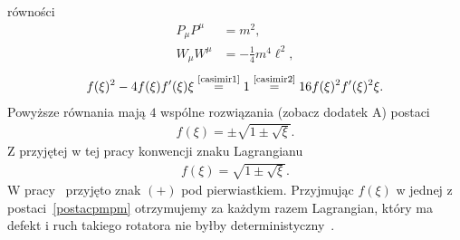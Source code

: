 równości
\begin{align} \label{casimir1}
P_\mu P^\mu &= m^2, \tag{C1} \\ \label{casimir2}
W_\mu W^\mu &= - \frac{1}{4} m^4 \ell^2 , \tag{C2}
\end{align}
\begin{align}\nonumber
 f(\xi)^2- 4 f(\xi) f'(\xi) \xi
\stackrel{\text{\ref{casimir1}}}{=} 
1 \stackrel{\text{\ref{casimir2}}}{=}
  16   f(\xi)^2 f'(\xi)^2 \xi .
\end{align}
Powyższe równania mają $4$ wspólne rozwiązania (zobacz dodatek A)
postaci 
\begin{align}\label{postacpmpm}
f(\xi ) = \pm \sqrt{ 1 \pm \sqrt{\xi} }.
\end{align}
Z przyjętej w tej pracy konwencji znaku Lagrangianu 
\begin{align*}
f(\xi ) =  \sqrt{ 1 \pm \sqrt{\xi} }.
\end{align*}
W pracy~\cite{star2008} przyjęto znak $(+)$ pod pierwiastkiem.
Przyjmując $f(\xi)$ w jednej z postaci~\eqref{postacpmpm} otrzymujemy 
za każdym razem Lagrangian, który ma defekt i ruch takiego 
rotatora nie byłby deterministyczny~\cite{Bratek2012Spinorindeterm}.



